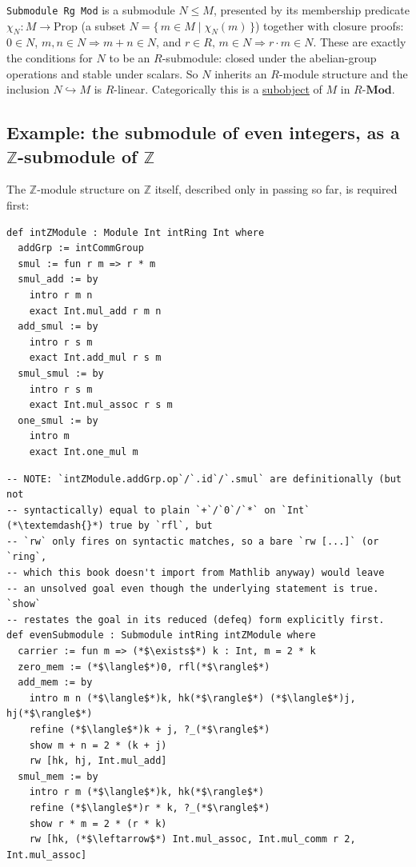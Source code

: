 \begin{mathreading}

\texttt{Submodule Rg Mod} is a submodule \(N \le M\), presented by its membership predicate \(\chi_N : M \to \mathrm{Prop}\) (a subset \(N = \{\,m \in M \mid \chi_N(m)\,\}\)) together with closure proofs: \(0 \in N\), \(m,n \in N \Rightarrow m+n \in N\), and \(r\in R,\, m\in N
\Rightarrow r\cdot m \in N\). These are exactly the conditions for \(N\) to be an \(R\)-submodule: closed under the abelian-group operations and stable under scalars. So \(N\) inherits an \(R\)-module structure and the inclusion \(N \hookrightarrow M\) is \(R\)-linear. Categorically this is a \hyperref[sec:01-basics:04-terminology:1]{subobject} of \(M\) in \(R\text{-}\mathbf{Mod}\).

\end{mathreading}

\subsection{\texorpdfstring{Example: the submodule of even integers, as a \(\mathbb{Z}\)-submodule of \(\mathbb{Z}\)}{Example: the submodule of even integers, as a \textbackslash mathbb\{Z\}-submodule of \textbackslash mathbb\{Z\}}}\label{sec:10-modules:04-submodules:2}

The \(\mathbb{Z}\)-module structure on \(\mathbb{Z}\) itself, described only in passing so far, is required first:

\begin{lstlisting}
def intZModule : Module Int intRing Int where
  addGrp := intCommGroup
  smul := fun r m => r * m
  smul_add := by
    intro r m n
    exact Int.mul_add r m n
  add_smul := by
    intro r s m
    exact Int.add_mul r s m
  smul_smul := by
    intro r s m
    exact Int.mul_assoc r s m
  one_smul := by
    intro m
    exact Int.one_mul m
\end{lstlisting}

\begin{lstlisting}
-- NOTE: `intZModule.addGrp.op`/`.id`/`.smul` are definitionally (but not
-- syntactically) equal to plain `+`/`0`/`*` on `Int` (*\textemdash{}*) true by `rfl`, but
-- `rw` only fires on syntactic matches, so a bare `rw [...]` (or `ring`,
-- which this book doesn't import from Mathlib anyway) would leave
-- an unsolved goal even though the underlying statement is true. `show`
-- restates the goal in its reduced (defeq) form explicitly first.
def evenSubmodule : Submodule intRing intZModule where
  carrier := fun m => (*$\exists$*) k : Int, m = 2 * k
  zero_mem := (*$\langle$*)0, rfl(*$\rangle$*)
  add_mem := by
    intro m n (*$\langle$*)k, hk(*$\rangle$*) (*$\langle$*)j, hj(*$\rangle$*)
    refine (*$\langle$*)k + j, ?_(*$\rangle$*)
    show m + n = 2 * (k + j)
    rw [hk, hj, Int.mul_add]
  smul_mem := by
    intro r m (*$\langle$*)k, hk(*$\rangle$*)
    refine (*$\langle$*)r * k, ?_(*$\rangle$*)
    show r * m = 2 * (r * k)
    rw [hk, (*$\leftarrow$*) Int.mul_assoc, Int.mul_comm r 2, Int.mul_assoc]
\end{lstlisting}

